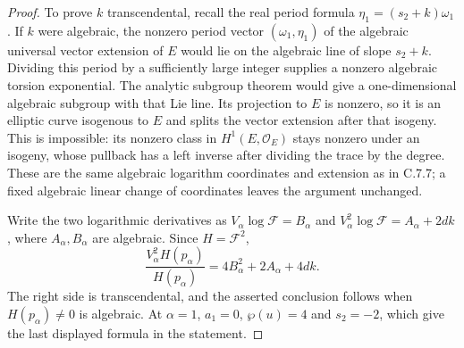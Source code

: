 \begin{proof}
To prove $k$ transcendental, recall the real period formula
$\eta_1=(s_2+k)\omega_1$. If $k$ were algebraic, the
nonzero period vector $(\omega_1,\eta_1)$ of the algebraic
universal vector extension of $E$ would lie on the algebraic
line of slope $s_2+k$. Dividing this period by a sufficiently
large integer supplies a nonzero algebraic torsion exponential.
The analytic subgroup theorem
\citep[Theorem 6.1]{huber2022} would give a one-dimensional
algebraic subgroup with that Lie line. Its projection to $E$
is nonzero, so it is an elliptic curve isogenous to $E$ and
splits the vector extension after that isogeny. This is
impossible: its nonzero class in $H^1(E,\mathcal O_E)$ stays
nonzero under an isogeny, whose pullback has a left inverse
after dividing the trace by the degree. These are the same
algebraic logarithm coordinates and extension as in C.7.7;
a fixed algebraic linear change of coordinates leaves the
argument unchanged.

Write the two logarithmic derivatives as
$V_\alpha\log\mathcal F=B_\alpha$ and
$V_\alpha^2\log\mathcal F=A_\alpha+2dk$, where
$A_\alpha,B_\alpha$ are algebraic. Since $H=\mathcal F^2$,
\[
 \frac{V_\alpha^2H(p_\alpha)}{H(p_\alpha)}
       =4B_\alpha^2+2A_\alpha+4dk.
\]
The right side is transcendental, and the asserted conclusion
follows when $H(p_\alpha)\ne0$ is algebraic.
At $\alpha=1$, $a_1=0$, $\wp(u)=4$ and $s_2=-2$,
which give the last displayed formula in the statement.
\end{proof}
